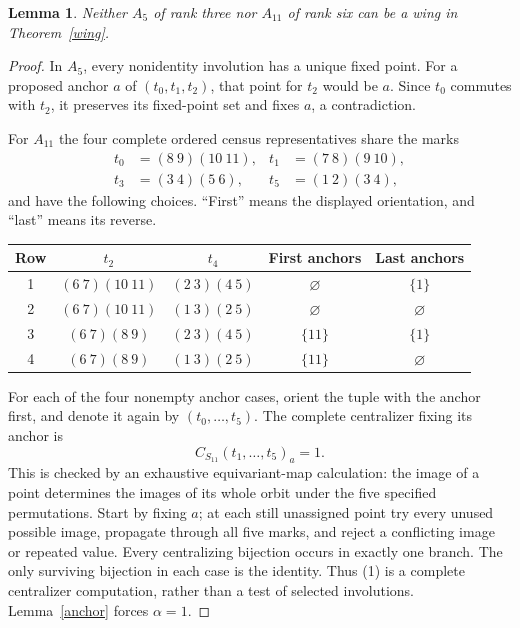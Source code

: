 \documentclass[11pt,a4paper]{article}
\newtheorem{lemma}[theorem]{Lemma}
\begin{document}
\begin{lemma}\label{alternating}
Neither $A_5$ of rank three nor $A_{11}$ of rank six can be a
wing in Theorem~\ref{wing}.
\end{lemma}
\begin{proof}
In $A_5$, every nonidentity involution has a unique fixed point.
For a proposed anchor $a$ of $(t_0,t_1,t_2)$, that point for
$t_2$ would be $a$. Since $t_0$ commutes with $t_2$, it preserves
its fixed-point set and fixes $a$, a contradiction.

For $A_{11}$ the four complete ordered census representatives
share the marks
\[
\begin{aligned}
 t_0&=(8\ 9)(10\ 11),& t_1&=(7\ 8)(9\ 10),\\
 t_3&=(3\ 4)(5\ 6),& t_5&=(1\ 2)(3\ 4),
\end{aligned}
\]
and have the following choices. ``First'' means the displayed
orientation, and ``last'' means its reverse.
\begin{center}
\begin{tabular}{ccccc}
\toprule
Row&$t_2$&$t_4$&First anchors&Last anchors\\
\midrule
1&$(6\ 7)(10\ 11)$&$(2\ 3)(4\ 5)$&$\varnothing$&$\{1\}$\\
2&$(6\ 7)(10\ 11)$&$(1\ 3)(2\ 5)$&$\varnothing$&$\varnothing$\\
3&$(6\ 7)(8\ 9)$&$(2\ 3)(4\ 5)$&$\{11\}$&$\{1\}$\\
4&$(6\ 7)(8\ 9)$&$(1\ 3)(2\ 5)$&$\{11\}$&$\varnothing$\\
\bottomrule
\end{tabular}
\end{center}
For each of the four nonempty anchor cases, orient the tuple
with the anchor first, and denote it again by $(t_0,\ldots,t_5)$.
The complete centralizer fixing its anchor is
\[
 C_{S_{11}}(t_1,\ldots,t_5)_a=1.                 \tag{1}
\]
This is checked by an exhaustive equivariant-map calculation:
the image of a point determines the images of its whole orbit
under the five specified permutations. Start by fixing $a$;
at each still unassigned point try every unused possible image,
propagate through all five marks, and reject a conflicting image
or repeated value. Every centralizing bijection occurs in exactly
one branch. The only surviving bijection in each case is the
identity. Thus (1) is a complete centralizer computation, rather
than a test of selected involutions. Lemma~\ref{anchor} forces
$\alpha=1$.


\end{proof}
\end{document}
